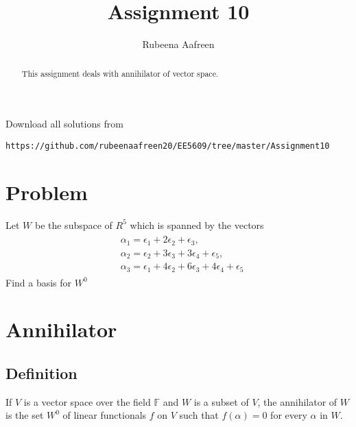 \documentclass[journal,12pt,twocolumn]{IEEEtran}
\begin{document}
\renewcommand{\thefigure}{\theproblem}
\def\putbox#1#2#3{\makebox[0in][l]{\makebox[#1][l]{}\raisebox{\baselineskip}[0in][0in]{\raisebox{#2}[0in][0in]{#3}}}}
     \def\rightbox#1{\makebox[0in][r]{#1}}
     \def\centbox#1{\makebox[0in]{#1}}
     \def\topbox#1{\raisebox{-\baselineskip}[0in][0in]{#1}}
     \def\midbox#1{\raisebox{-0.5\baselineskip}[0in][0in]{#1}}
\vspace{3cm}
\title{Assignment 10}
\author{Rubeena Aafreen}
\maketitle
\newpage
\bigskip
\renewcommand{\thefigure}{\theenumi}
\renewcommand{\thetable}{\theenumi}
\begin{abstract}
This assignment deals with annihilator of vector space.
\end{abstract}
Download  all solutions from 
\begin{lstlisting}
https://github.com/rubeenaafreen20/EE5609/tree/master/Assignment10
\end{lstlisting}
\section{Problem}
Let $W$ be the subspace of $R^5$ which is spanned by the vectors  
   \begin{multline}
    \begin{aligned}
    &\alpha_1=\epsilon_1+2\epsilon_2+\epsilon_3,\\ &\alpha_2=\epsilon_2+3\epsilon_3+3\epsilon_4+\epsilon_5,\\&\alpha_3=\epsilon_1+4\epsilon_2+6\epsilon_3+4\epsilon_4+\epsilon_5
    \end{aligned}
    \end{multline}
    Find a basis for $W^0$
\section{Annihilator}
\subsection{Definition}
 If $V$ is a vector space over the field $\mathbb{F}$ and $W$ is a subset of $V$, the annihilator of $W$ is the set $W^0$ of linear functionals $f$ on $V$ such that $f(\alpha)=0$ for every $\alpha$ in $W$.
\end{document}
